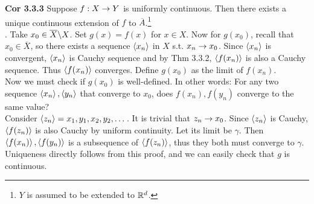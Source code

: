 \textbf{Cor 3.3.3} Suppose $f:X\rightarrow Y$ is uniformly continuous. Then there exists a unique continuous extension of $f$ to $\overline{A}$.\footnote{$Y$ is assumed to be extended to $\mathbb{R}^d$.}\\
\pf. Take $x_0\in \overline{X}\backslash X$. Set $g(x) = f(x)$ for $x\in X$. Now for $g(x_0)$, recall that $x_0\in \overline{X}$, so there exists a sequence $\left\langle x_n \right\rangle$ in $X$ s.t. $x_n\rightarrow x_0$. Since $\left\langle x_n \right\rangle$ is convergent, $\left\langle x_n \right\rangle$ is Cauchy sequence and by Thm 3.3.2, $\left\langle f(x_n) \right\rangle$ is also a Cauchy sequence. Thus $\left\langle f(x_n) \right\rangle$ converges. Define $g(x_0)$ as the limit of $f(x_n)$.\\
Now we must check if $g(x_0)$ is well-defined. In other words: For any two sequence $\left\langle x_n \right\rangle, \left\langle y_n \right\rangle$ that converge to $x_0$, does $f(x_n), f(y_n)$ converge to the same value?\\
Consider $\left\langle z_n \right\rangle = x_1, y_1, x_2, y_2, \dots$. It is trivial that $z_n\rightarrow x_0$. Since $\left\langle z_n \right\rangle$ is Cauchy, $\left\langle f(z_n) \right\rangle$ is also Cauchy by uniform continuity. Let its limit be $\gamma$. Then $\left\langle f(x_n) \right\rangle, \left\langle f(y_n) \right\rangle$ is a subsequence of $\left\langle f(z_n) \right\rangle$, thus they both must converge to $\gamma$. Uniqueness directly follows from this proof, and we can easily check that $g$ is continuous.
\pagebreak